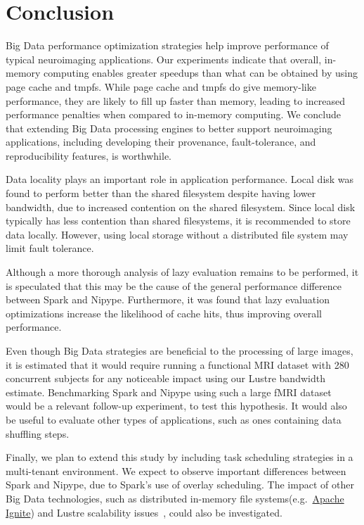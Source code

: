 \section{Conclusion} %
\label{sec:conclusion}

Big Data performance optimization strategies help improve performance of typical 
neuroimaging applications. Our experiments indicate that overall, in-memory computing 
enables greater speedups than what can be obtained by using page cache 
and tmpfs. While page cache and tmpfs do give memory-like performance, 
they are likely to fill up faster than memory, leading to increased 
performance penalties when compared to in-memory computing. We conclude 
that extending Big Data processing engines to better support 
neuroimaging applications, including developing their provenance, 
fault-tolerance, and reproducibility features, is worthwhile.

Data locality plays an important role in application 
performance. Local disk was found to perform better than the shared 
filesystem despite having lower bandwidth, due to increased contention on 
the shared filesystem. Since local disk typically has less 
contention than shared filesystems, it is recommended to store data locally.
However, using local storage without a distributed file system 
may limit fault tolerance.

Although a more thorough analysis of lazy evaluation remains to be 
performed, it is speculated that this may be the cause of the general 
performance difference between Spark and Nipype. Furthermore, it was
found that lazy evaluation optimizations increase the likelihood of 
cache hits, thus improving overall performance.

Even though Big Data strategies are beneficial to the processing of 
large images, it is estimated that it would require running a 
functional MRI dataset with 280 concurrent subjects for any noticeable 
impact using our Lustre bandwidth estimate. Benchmarking Spark and 
Nipype using such a large fMRI dataset would be a relevant follow-up 
experiment, to test this hypothesis. It would also be useful to evaluate
other types of applications, such as ones containing data shuffling steps.

Finally, we plan to extend this study by including task scheduling 
strategies in a multi-tenant environment. We expect to observe 
important differences between Spark and Nipype, due to Spark's use of 
overlay scheduling. The impact of other Big Data technologies, such as 
distributed in-memory file systems(e.g.~\href{https://ignite.apache.org}{Apache Ignite}) and Lustre scalability issues~\cite{sparkhpc},
could also be investigated.